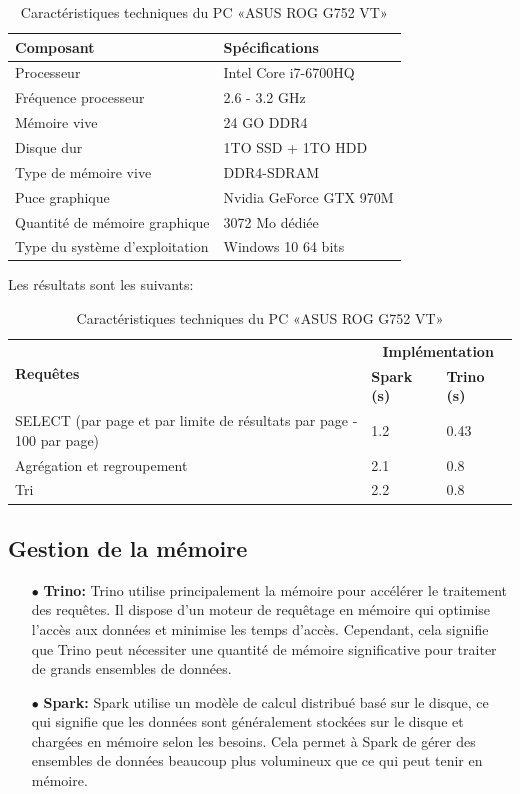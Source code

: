 \begin{table}[h]
\centering
\label{tab:caracteristiques-2}
\begin{tabular}{|l|l|}
\hline
\textbf{Composant} & \textbf{Spécifications} \\ \hline
Processeur & Intel Core i7-6700HQ \\ \hline
Fréquence processeur & 2.6 - 3.2 GHz \\ \hline
Mémoire vive & 24 GO DDR4 \\ \hline
Disque dur & 1TO SSD + 1TO HDD \\ \hline
Type de mémoire vive & DDR4-SDRAM \\ \hline
Puce graphique & Nvidia GeForce GTX 970M \\ \hline
Quantité de mémoire graphique & 3072 Mo dédiée \\\hline
Type du système d'exploitation & Windows 10 64 bits \\ \hline
\end{tabular}
\caption{Caractéristiques techniques du PC «ASUS ROG G752 VT»}
\end{table}

Les résultats sont les suivants:

\begin{table}[h]
\centering
\label{tab:resultats}
\begin{tabular}{|l|l|l|}
\hline
\multirow{2}{*}{\textbf{Requêtes}} & \multicolumn{2}{c|}{\textbf{Implémentation}} \\ \cline{2-3}
& \textbf{Spark (s)} & \textbf{Trino (s)} \\ \hline
SELECT (par page et par limite de résultats par page - 100 par page) & 1.2 & 0.43 \\ \hline
Agrégation et regroupement & 2.1 & 0.8 \\ \hline
Tri & 2.2 & 0.8 \\ \hline
\end{tabular}
\caption{Caractéristiques techniques du PC «ASUS ROG G752 VT»}
\end{table}

\subsection{Gestion de la mémoire}
\begin{enumerate}
    \item[$\bullet$] \textbf{Trino:} Trino utilise principalement la mémoire pour accélérer le traitement des requêtes. Il dispose d'un moteur de requêtage en mémoire qui optimise l'accès aux données et minimise les temps d'accès. Cependant, cela signifie que Trino peut nécessiter une quantité de mémoire significative pour traiter de grands ensembles de données.
    \item[$\bullet$] \textbf{Spark:} Spark utilise un modèle de calcul distribué basé sur le disque, ce qui signifie que les données sont généralement stockées sur le disque et chargées en mémoire selon les besoins. Cela permet à Spark de gérer des ensembles de données beaucoup plus volumineux que ce qui peut tenir en mémoire.
\end{enumerate}
    
